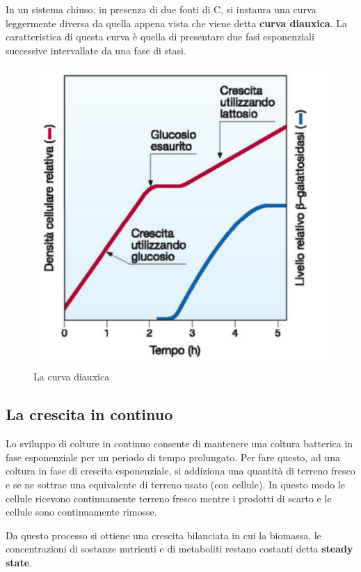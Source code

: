 \documentclass[11pt]{book}
\begin{document}
In un sistema chiuso, in presenza di due fonti di C, si instaura una curva leggermente diversa da quella appena vista che viene detta \textbf{curva diauxica}. La caratteristica di questa curva è quella di presentare due fasi esponenziali successive intervallate da una fase di stasi.

\clearpage
\begin{figure}[htp]
\centering
\includegraphics[scale=0.5]{img/Curva diauxica.png}
\caption{La curva diauxica}
\label{}
\end{figure}

\subsection{La crescita in continuo}
Lo sviluppo di colture in continuo consente di mantenere una coltura batterica in fase esponenziale per un periodo di tempo prolungato.
Per fare questo, ad una coltura in fase di crescita esponenziale, si addiziona una quantità di terreno fresco e se ne sottrae una equivalente di terreno usato (con cellule). In questo modo le cellule ricevono continuamente terreno fresco mentre i prodotti di scarto e le cellule sono continuamente rimosse.

Da questo processo si ottiene una crescita bilanciata in cui la biomassa, le concentrazioni di sostanze nutrienti e di metaboliti restano costanti detta \textbf{steady state}.
\end{document}
